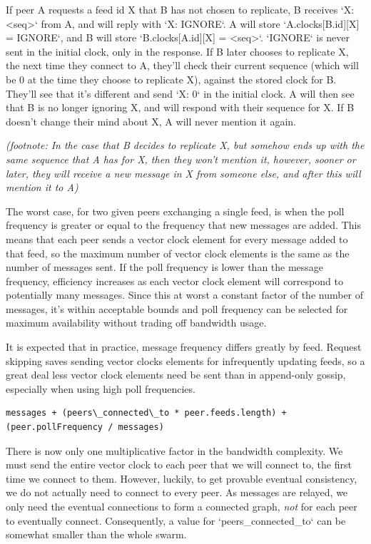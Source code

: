 \documentclass[sigconf]{acmart}
\begin{document}
If peer A requests a feed id X that B has not chosen to replicate, B
receives `X: <seq>` from A, and will reply with `X: IGNORE`.  A will
store `A.clocks[B.id][X] = IGNORE`, and B will store
`B.clocks[A.id][X] = <seq>`.  `IGNORE` is never sent in the initial
clock, only in the response. If B later chooses to replicate X, the
next time they connect to A, they'll check their current sequence
(which will be 0 at the time they choose to replicate X), against the
stored clock for B. They'll see that it's different and send `X: 0` in
the initial clock. A will then see that B is no longer ignoring X, and
will respond with their sequence for X. If B doesn't change their mind
about X, A will never mention it again.

{\em (footnote: In the case that B decides to replicate X, but somehow
  ends up with the same sequence that A has for X, then they won't
  mention it, however, sooner or later, they will receive a new
  message in X from someone else, and after this will mention it to A)}

The worst case, for two given peers exchanging a single feed, is when
the poll frequency is greater or equal to the frequency that new
messages are added. This means that each peer sends a vector clock
element for every message added to that feed, so the maximum number of
vector clock elements is the same as the number of messages sent. If
the poll frequency is lower than the message frequency, efficiency
increases as each vector clock element will correspond to potentially
many messages. Since this at worst a constant factor of the number of
messages, it's within acceptable bounds and poll frequency can be
selected for maximum availability without trading off bandwidth usage.

It is expected that in practice, message frequency differs greatly by
feed.  Request skipping saves sending vector clocks elements for
infrequently updating feeds, so a great deal less vector clock
elements need be sent than in append-only gossip, especially when
using high poll frequencies.

\begin{verbatim}
messages + (peers\_connected\_to * peer.feeds.length) + (peer.pollFrequency / messages)
\end{verbatim}

There is now only one multiplicative factor in the bandwidth
complexity.  We must send the entire vector clock to each peer that we
will connect to, the first time we connect to them. However, luckily,
to get provable eventual consistency, we do not actually need to
connect to every peer. As messages are relayed, we only need the
eventual connections to form a connected graph, {\em not} for each
peer to eventually connect. Consequently, a value for
`peers\_connected\_to` can be somewhat smaller than the whole swarm.
\end{document}
